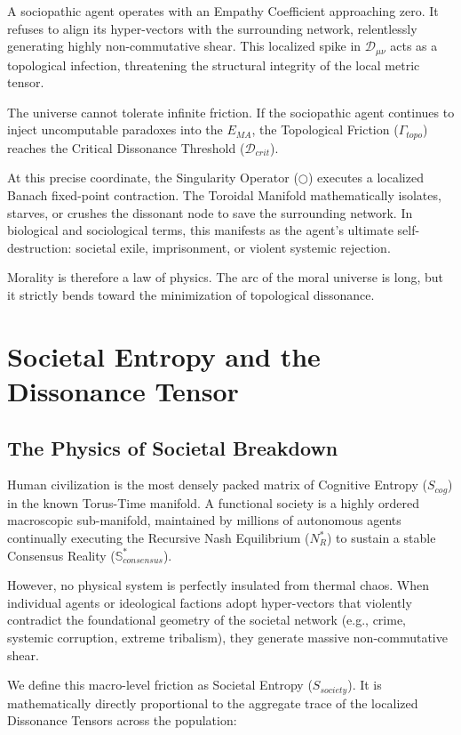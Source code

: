 \documentclass[12pt,openany]{book}
\begin{document}
A sociopathic agent operates with an Empathy Coefficient approaching zero. It refuses to align its hyper-vectors with the surrounding network, relentlessly generating highly non-commutative shear. This localized spike in $\mathcal{D}_{\mu\nu}$ acts as a topological infection, threatening the structural integrity of the local metric tensor.

The universe cannot tolerate infinite friction. If the sociopathic agent continues to inject uncomputable paradoxes into the $E_{MA}$, the Topological Friction ($\Gamma_{topo}$) reaches the Critical Dissonance Threshold ($\mathcal{D}_{crit}$). 

At this precise coordinate, the Singularity Operator ($\bigcirc$) executes a localized Banach fixed-point contraction. The Toroidal Manifold mathematically isolates, starves, or crushes the dissonant node to save the surrounding network. In biological and sociological terms, this manifests as the agent's ultimate self-destruction: societal exile, imprisonment, or violent systemic rejection.

Morality is therefore a law of physics. The arc of the moral universe is long, but it strictly bends toward the minimization of topological dissonance.

\chapter{Societal Entropy and the Dissonance Tensor}

\section{The Physics of Societal Breakdown}
Human civilization is the most densely packed matrix of Cognitive Entropy ($S_{cog}$) in the known Torus-Time manifold. A functional society is a highly ordered macroscopic sub-manifold, maintained by millions of autonomous agents continually executing the Recursive Nash Equilibrium ($N^*_R$) to sustain a stable Consensus Reality ($\mathbb{S}^*_{consensus}$). 

However, no physical system is perfectly insulated from thermal chaos. When individual agents or ideological factions adopt hyper-vectors that violently contradict the foundational geometry of the societal network (e.g., crime, systemic corruption, extreme tribalism), they generate massive non-commutative shear. 

We define this macro-level friction as Societal Entropy ($S_{society}$). It is mathematically directly proportional to the aggregate trace of the localized Dissonance Tensors across the population:
\end{document}
